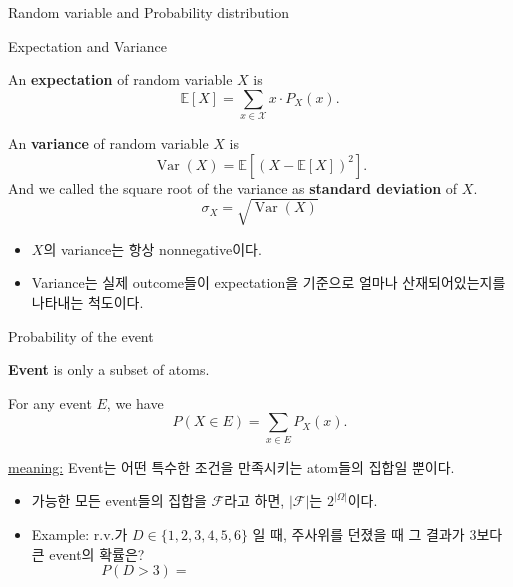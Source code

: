 \documentclass[9pt]{beamer}
\begin{document}
\begin{section}{Random variable and Probability distribution}
      \begin{frame}{Expectation and Variance}
        \begin{definition}[expectation]
          An \textbf{expectation} of random variable $X$ is 
          $$ \mathbb E [X] = \sum_{x \in \mathcal X} x \cdot P_X(x).$$
        \end{definition}
        \begin{definition}
          An \textbf{variance} of random variable $X$ is 
          $$ \operatorname{Var}(X) = \mathbb E[(X - \mathbb E[X])^2].$$
          And we called the square root of the variance as \textbf{standard deviation} of $X$.
          $$ \sigma_X = \sqrt{\operatorname{Var}(X) } $$
        \end{definition}
        \begin{itemize}
          \item $X$의 variance는 항상 nonnegative이다.
          \item Variance는 실제 outcome들이 expectation을 기준으로 얼마나 산재되어있는지를 나타내는 척도이다.
        \end{itemize}
      \end{frame}

      \begin{frame}{Probability of the event}
        \begin{definition}[event]
          \textbf{Event} is only a \alert{subset of atoms}.
        \end{definition}
        \begin{theorem}
          For any event $E$, we have 
          $$P(X\in E) = \sum_{x \in E} P_X(x).$$
        \end{theorem}
        \checkmark \underline{meaning:} Event는 어떤 특수한 조건을 만족시키는 atom들의 집합일 뿐이다. 
        \begin{itemize}
          \item 가능한 모든 event들의 집합을 $\mathcal F$라고 하면, $|\mathcal F|$는 $2^{|\Omega|}$이다.
          \item Example: r.v.가 $D \in \{1, 2, 3, 4, 5, 6\}$ 일 때, 주사위를 던졌을 때 그 결과가 3보다 큰 event의 확률은?
          $$ P(D>3) = \qquad \qquad \qquad \qquad \qquad \qquad \qquad \qquad \qquad  $$
        \end{itemize}
      \end{frame}


\end{section}
\end{document}
